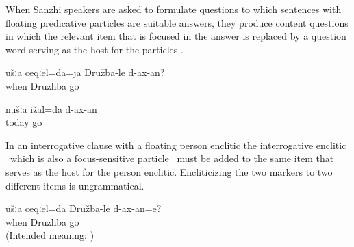 When Sanzhi speakers are asked to formulate questions to which sentences with floating predicative particles are suitable answers, they produce content questions in which the relevant item that is focused in the answer is replaced by a question word serving as the host for the particles . 
%
\begin{exe}
	\ex	\label{ex:WHEN will you / do you have to go to Druzhba We will / have to go TODAY@9}
	\begin{xlist}
		\ex	\label{ex:WHEN will you / do you have to go to Druzhba@9a}
		\gll	ušːa	ceqːel=da=ja	Družba-le	d-ax-an?\\
				when	Druzhba	go\\
		\glt	{}

		\ex	\label{ex:We will / have to go TODAY@9b}
		\gll	nušːa	ižal=da	d-ax-an\\
				today	go\\
		\glt	{}
	\end{xlist}
\end{exe}

In an interrogative clause with a floating person enclitic the interrogative enclitic \tnd\ which is also a focus-sensitive particle \tnd\ must be added to the same item that serves as the host for the person enclitic. Encliticizing the two markers to two different items  is ungrammatical.
%
\begin{exe}
	\ex	\label{ex:WHEN will you / do you have to go to DruzhbaWRONG}
	\gll	{*}	ušːa	ceqːel=da	Družba-le	d-ax-an=e?\\
		{}		when	Druzhba	go\\
	\glt	(Intended meaning: )
\end{exe}

